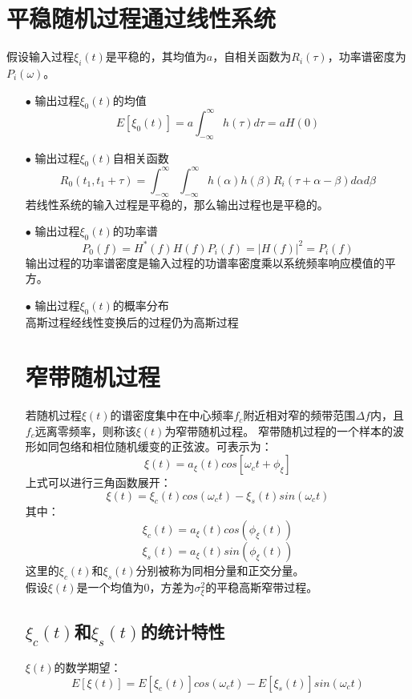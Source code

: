 \documentclass[12pt,a4paper,oneside]{ctexart}
\begin{document}
\section{平稳随机过程通过线性系统}
假设输入过程$\xi_{i}(t)$是平稳的，其均值为$a$，自相关函数为$R_{i}(\tau)$，功率谱密度为$P_{i}(\omega)$。
\begin{itemize}
    \item[$\bullet$] 输出过程$\xi_{0}(t)$的均值
    $$
        E\left[\xi_{0}(t)\right] = a\int_{-\infty}^{\infty}h(\tau)d\tau = aH(0)
    $$
    \item[$\bullet$] 输出过程$\xi_{0}(t)$自相关函数
    $$
        R_{0}(t_{1},t_{1} + \tau) = \int_{-\infty}^{\infty}\int_{-\infty}^{\infty}h(\alpha)h(\beta)R_{i}(\tau + \alpha - \beta)d\alpha d\beta
    $$ 
    若线性系统的输入过程是平稳的，那么输出过程也是平稳的。
    \item[$\bullet$] 输出过程$\xi_{0}(t)$的功率谱
    $$
        P_{0}(f) = H^{*}(f)H(f)P_{i}(f) = |H(f)|^{2} = P_{i}(f)  
    $$
    输出过程的功率谱密度是输入过程的功谱率密度乘以系统频率响应模值的平方。
    \item[$\bullet$] 输出过程$\xi_{0}(t)$的概率分布\\
    高斯过程经线性变换后的过程仍为高斯过程 
\section{窄带随机过程}
若随机过程$\xi(t)$的谱密度集中在中心频率$f_{c}$附近相对窄的频带范围$\Delta f$内，且$f_{c}$远离零频率，则称该$\xi(t)$为窄带随机过程。
窄带随机过程的一个样本的波形如同包络和相位随机缓变的正弦波。可表示为：
$$
    \xi(t) = a_{\xi}(t)cos\left[\omega_{c}t + \phi_{\xi} \right]
$$
上式可以进行三角函数展开：
$$
    \xi(t) = \xi_{c}(t)cos(\omega_{c}t) - \xi_{s}(t)sin(\omega_{c}t)
$$
其中：
$$
    \xi_{c}(t) = a_{\xi}(t)cos(\phi_{\xi}(t))
$$
$$
    \xi_{s}(t) = a_{\xi}(t)sin(\phi_{\xi}(t))
$$
这里的$\xi_{c}(t)$和$\xi_{s}(t)$分别被称为同相分量和正交分量。\\
假设$\xi(t)$是一个均值为0，方差为$\sigma^{2}_{\xi}$的平稳高斯窄带过程。
\subsection{$\xi_{c}(t)$和$\xi_{s}(t)$的统计特性}
$\xi(t)$的数学期望：
$$
    E\left[\xi(t)\right] = E\left[\xi_{c}(t)\right]cos(\omega_{c}t) - E\left[\xi_{s}(t)\right]sin(\omega_{c}t)
$$
\end{itemize}
\end{document}

